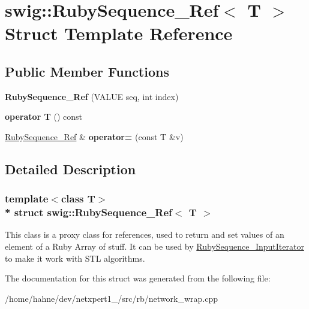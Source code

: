 \hypertarget{structswig_1_1RubySequence__Ref}{}\section{swig\+:\+:Ruby\+Sequence\+\_\+\+Ref$<$ T $>$ Struct Template Reference}
\label{structswig_1_1RubySequence__Ref}
\subsection*{Public Member Functions}
\begin{DoxyCompactItemize}
\item 
{\bfseries Ruby\+Sequence\+\_\+\+Ref} (V\+A\+L\+UE seq, int index)\hypertarget{structswig_1_1RubySequence__Ref_ad1a598572d6dd660d3e9f508c85ac823}{}\label{structswig_1_1RubySequence__Ref_ad1a598572d6dd660d3e9f508c85ac823}

\item 
{\bfseries operator T} () const \hypertarget{structswig_1_1RubySequence__Ref_a113fc0c849980bd2dba15fecee11d8b2}{}\label{structswig_1_1RubySequence__Ref_a113fc0c849980bd2dba15fecee11d8b2}

\item 
\hyperlink{structswig_1_1RubySequence__Ref}{Ruby\+Sequence\+\_\+\+Ref} \& {\bfseries operator=} (const T \&v)\hypertarget{structswig_1_1RubySequence__Ref_a9a73b9d12f2d1e74becdbc333bb3699f}{}\label{structswig_1_1RubySequence__Ref_a9a73b9d12f2d1e74becdbc333bb3699f}

\end{DoxyCompactItemize}


\subsection{Detailed Description}
\subsubsection*{template$<$class T$>$\\*
struct swig\+::\+Ruby\+Sequence\+\_\+\+Ref$<$ T $>$}

This class is a proxy class for references, used to return and set values of an element of a Ruby Array of stuff. It can be used by \hyperlink{structswig_1_1RubySequence__InputIterator}{Ruby\+Sequence\+\_\+\+Input\+Iterator} to make it work with S\+TL algorithms. 

The documentation for this struct was generated from the following file\+:\begin{DoxyCompactItemize}
\item 
/home/hahne/dev/netxpert1\+\_/src/rb/network\+\_\+wrap.\+cpp\end{DoxyCompactItemize}
